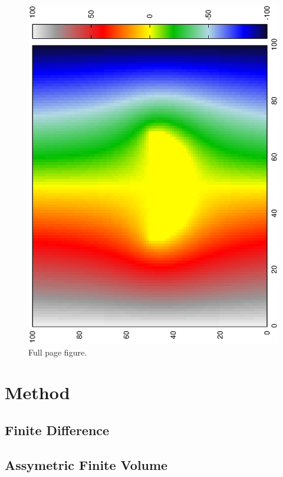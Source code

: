 \documentclass[aps,twocolumn,pre,nofootinbib]{revtex4-1}
\begin{document}
\begin{figure}

\includegraphics*[width= 1.6 \columnwidth]{circle.ps} 
\caption{Full page figure.
}
\label{fig:Full}
\end{figure}


\section{Method \label{sec:met}}

 
\subsection{Finite Difference }


\subsection{Assymetric Finite Volume }
\end{document}
